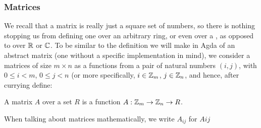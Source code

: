 \documentclass{article}
\begin{document}
\subsubsection{Matrices}
We recall that a matrix is really just a square set of numbers, so there is nothing stopping us from defining one over an arbitrary ring, or even over a \nanring, as opposed to over $\mathbb{R}$ or $\mathbb{C}$. To be similar to the definition we will make in Agda of an abstract matrix (one without a specific implementation in mind), we consider a matrices of size $m \times n$ as a functions from a pair of natural numbers $(i,j)$, with $0 \le i < m$, $0 \le j < n$ (or more specifically, $i \in \mathbb{Z}_{m}$, $j \in \mathbb{Z}_{n}$, and hence, after currying  define: 
\begin{Definition}
A matrix $A$ over a set $R$ is a function $A : \mathbb{Z}_{m} \to \mathbb{Z}_{n} \to R$. 
\end{Definition}
When talking about matrices mathematically, we write $A_{i j}$ for $A i j$


\end{document}
